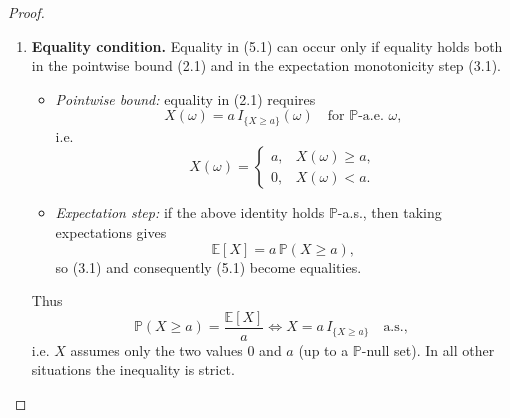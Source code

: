 \begin{proof}
\begin{enumerate}
\item \textbf{Equality condition.}  
Equality in (5.1) can occur only if equality holds both in the pointwise bound (2.1) and in the expectation monotonicity step (3.1).

\begin{itemize}
\item \emph{Pointwise bound:} equality in (2.1) requires
\[
X(\omega)=a\,I_{\{X\ge a\}}(\omega)\quad\text{for }\mathbb{P}\text{-a.e. }\omega,
\]
i.e.
\[
X(\omega)=
\begin{cases}
a, & X(\omega)\ge a,\\
0, & X(\omega)< a .
\end{cases}
\]

\item \emph{Expectation step:} if the above identity holds \(\mathbb{P}\)-a.s., then taking expectations gives
\[
\mathbb{E}[X]=a\,\mathbb{P}(X\ge a),
\]
so (3.1) and consequently (5.1) become equalities.
\end{itemize}
Thus
\[
\mathbb{P}(X\ge a)=\frac{\mathbb{E}[X]}{a}
\iff
X=a\,I_{\{X\ge a\}}\quad\text{a.s.},
\]
i.e. \(X\) assumes only the two values \(0\) and \(a\) (up to a \(\mathbb{P}\)-null set). In all other situations the inequality is strict.
\end{enumerate}
\end{proof}